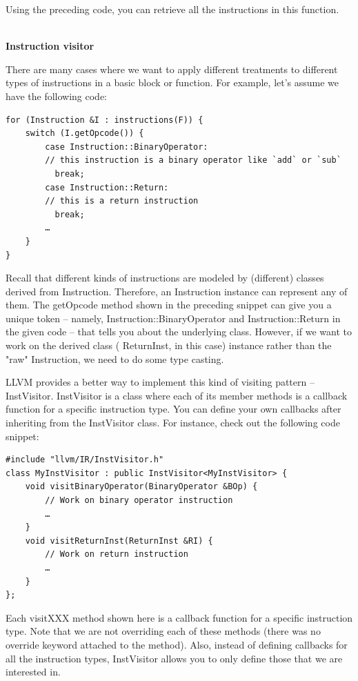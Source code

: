 Using the preceding code, you can retrieve all the instructions in this function.

\hspace*{\fill} \\ %
\noindent
\textbf{Instruction visitor}

There are many cases where we want to apply different treatments to different types of instructions in a basic block or function. For example, let's assume we have the following code:

\begin{lstlisting}[style=styleCXX]
for (Instruction &I : instructions(F)) {
	switch (I.getOpcode()) {
		case Instruction::BinaryOperator:
		// this instruction is a binary operator like `add` or `sub`
		  break;
		case Instruction::Return:
		// this is a return instruction
		  break;
		…
	}
}
\end{lstlisting}

Recall that different kinds of instructions are modeled by (different) classes derived from Instruction. Therefore, an Instruction instance can represent any of them. The getOpcode method shown in the preceding snippet can give you a unique token – namely, Instruction::BinaryOperator and Instruction::Return in the given code – that tells you about the underlying class. However, if we want to work on the derived class ( ReturnInst, in this case) instance rather than the "raw" Instruction, we need to do some type casting.

LLVM provides a better way to implement this kind of visiting pattern –InstVisitor. InstVisitor is a class where each of its member methods is a callback function for a specific instruction type. You can define your own callbacks after inheriting from the InstVisitor class. For instance, check out the following code snippet:

\begin{lstlisting}[style=styleCXX]
#include "llvm/IR/InstVisitor.h"
class MyInstVisitor : public InstVisitor<MyInstVisitor> {
	void visitBinaryOperator(BinaryOperator &BOp) {
		// Work on binary operator instruction
		…
	}
	void visitReturnInst(ReturnInst &RI) {
		// Work on return instruction
		…
	}
};
\end{lstlisting}

Each visitXXX method shown here is a callback function for a specific instruction type. Note that we are not overriding each of these methods (there was no override keyword attached to the method). Also, instead of defining callbacks for all the instruction types, InstVisitor allows you to only define those that we are interested in.


